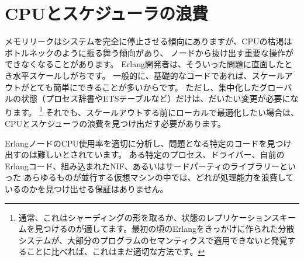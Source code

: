 \chapter{CPUとスケジューラの浪費}
\label{chap:cpu-hogs}

メモリリークはシステムを完全に停止させる傾向にありますが、CPUの枯渇はボトルネックのように振る舞う傾向があり、
ノードから抜け出す重要な操作ができなくなることがあります。
Erlang開発者は、そういった問題に直面したとき水平スケールしがちです。
一般的に、基礎的なコードであれば、スケールアウトがとても簡単にできることが多いからです。
ただし、集中化したグローバルの状態（プロセス辞書やETSテーブルなど）だけは、だいたい変更が必要になります。
\footnote{通常、これはシャーディングの形を取るか、状態のレプリケーションスキームを見つけるのが適してます。最初の頃のErlangをきっかけに作られた分散システムが、大部分のプログラムのセマンティクスで適用できないと発覚することに比べれば、これはまだ適切な方法です。}
それでも、スケールアウトする前にローカルで最適化したい場合は、CPUとスケジューラの浪費を見つけ出だす必要があります。

ErlangノードのCPU使用率を適切に分析し、問題となる特定のコードを見つけ出すのは難しいとされています。
ある特定のプロセス、ドライバー、自前のErlangコード、組み込まれたNIF、あるいはサードパーティのライブラリーといった
あらゆるものが並行する仮想マシンの中では、どれが処理能力を浪費しているのかを見つけ出せる保証はありません。

